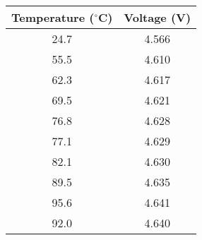 \begin{tabular}{|c|c|} %
        \hline
        \textbf{Temperature ($^{\circ}$C)} & \textbf{Voltage (V)} \\ %
        \hline
        24.7 & 4.566 \\ %
        \hline
        55.5 & 4.610 \\
        \hline
        62.3 & 4.617 \\
        \hline
        69.5 & 4.621 \\
        \hline
        76.8 & 4.628 \\
        \hline
        77.1 & 4.629 \\
        \hline
        82.1 & 4.630 \\
        \hline
        89.5 & 4.635 \\
        \hline
        95.6 & 4.641 \\
        \hline
        92.0 & 4.640 \\
        \hline
    \end{tabular}


